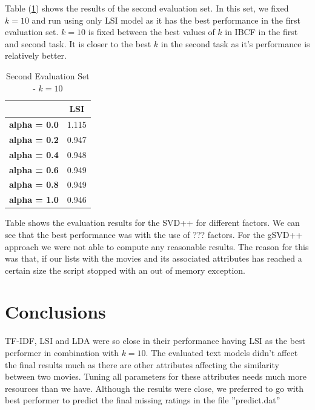 \documentclass{sigish}
\begin{document}
Table (\ref{tab:eval_02}) shows the results of the second evaluation set. In this set, we fixed $ k = 10 $ and run using only LSI model as it has the best performance in the first evaluation set. $ k = 10 $ is fixed between the best values of $ k $ in IBCF in the first and second task. It is closer to the best $ k $ in the second task as it's performance is relatively better.

\begin{table}[]
\centering
\begin{tabular}{|c|c|}
\hline
                     & \textbf{LSI} \\ \hline
\textbf{alpha = 0.0} & 1.115        \\ \hline
\textbf{alpha = 0.2} & 0.947        \\ \hline
\textbf{alpha = 0.4} & 0.948        \\ \hline
\textbf{alpha = 0.6} & 0.949        \\ \hline
\textbf{alpha = 0.8} & 0.949        \\ \hline
\textbf{alpha = 1.0} & 0.946        \\ \hline

\end{tabular}
\caption{Second Evaluation Set - $ k = 10 $}
\label{tab:eval_02}
\end{table}

Table shows the evaluation results for the SVD++ for different factors. We can see that the best performance was with the use of ??? factors.
\newline
\newline
For the gSVD++ approach we were not able to compute any reasonable results. The reason for this was that, if our lists with the movies and its associated attributes has reached a certain size the script stopped with an out of memory exception.


\section{Conclusions}

TF-IDF, LSI and LDA were so close in their performance having LSI as the best performer in combination with $ k = 10 $. The evaluated text models didn't affect the final results much as there are other attributes affecting the similarity between two movies. Tuning all parameters for these attributes needs much more resources than we have. Although the results were close, we preferred to go with best performer to predict the final missing ratings in the file ''predict.dat''



\end{document}
